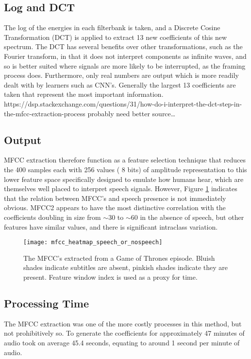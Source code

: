 \subsection{Log and DCT}
The log of the energies in each filterbank is taken, and a Discrete Cosine Transformation (DCT) is applied to extract 13 new coefficients of this new spectrum. The DCT has several benefits over other transformations, such as the Fourier transform, in that it does not interpret components as infinite waves, and so is better suited where signals are more likely to be interrupted, as the framing process does. Furthermore, only real numbers are output which is more readily dealt with by learners such as CNN’s. 
\newline
Generally the largest 13 coefficients are taken that represent the most important information.
https://dsp.stackexchange.com/questions/31/how-do-i-interpret-the-dct-step-in-the-mfcc-extraction-process 
probably need better source…

\subsection{Output}
MFCC extraction therefore function as a feature selection technique that reduces the 400 samples each with 256 values ( 8 bits) of amplitude representation to this lower feature space specifically designed to emulate how humans hear, which are themselves well placed to interpret speech signals. However, Figure \ref{mfccs_speech_orno} indicates that the relation between MFCC's and speech presence is not immediately obvious. MFCC2 appears to have the most distinctive correlation with the coefficients doubling in size from $\sim$30 to $\sim$60 in the absence of speech, but other features have similar values, and there is significant intraclass variation.

\begin{figure}[h]
	\texttt{[image: mfcc\_heatmap\_speech\_or\_nospeech]}
	\caption{The MFCC's extracted from a Game of Thrones episode. Bluish shades indicate subtitles are absent, pinkish shades indicate they are present. Feature window index is used as a proxy for time.}
	\label{mfccs_speech_orno}
\end{figure}

\subsection{Processing Time}
The MFCC extraction was one of the more costly processes in this method, but not prohibitively so. To generate the coefficients for approximately 47 minutes of audio took on average 45.4 seconds, equating to around 1 second per minute of audio.

